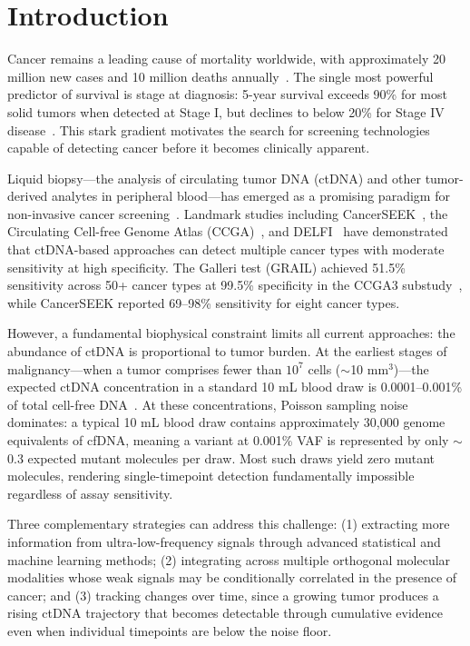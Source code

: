 \documentclass[10pt,a4paper]{article}
\begin{document}
\section{Introduction}

Cancer remains a leading cause of mortality worldwide, with approximately 20 million new cases and 10 million deaths annually~\citet{sung2021global}. The single most powerful predictor of survival is stage at diagnosis: 5-year survival exceeds 90\% for most solid tumors when detected at Stage I, but declines to below 20\% for Stage IV disease~\citet{siegel2024cancer}. This stark gradient motivates the search for screening technologies capable of detecting cancer before it becomes clinically apparent.

Liquid biopsy—the analysis of circulating tumor DNA (ctDNA) and other tumor-derived analytes in peripheral blood—has emerged as a promising paradigm for non-invasive cancer screening~\citet{wan2017liquid,cohen2018detection}. Landmark studies including CancerSEEK~\citet{cohen2018detection}, the Circulating Cell-free Genome Atlas (CCGA)~\citet{liu2020sensitive}, and DELFI~\citet{cristiano2019genome} have demonstrated that ctDNA-based approaches can detect multiple cancer types with moderate sensitivity at high specificity. The Galleri test (GRAIL) achieved 51.5\% sensitivity across 50+ cancer types at 99.5\% specificity in the CCGA3 substudy~\citet{klein2021clinical}, while CancerSEEK reported 69--98\% sensitivity for eight cancer types.

However, a fundamental biophysical constraint limits all current approaches: the abundance of ctDNA is proportional to tumor burden. At the earliest stages of malignancy—when a tumor comprises fewer than $10^7$ cells ($\sim$10 mm$^3$)—the expected ctDNA concentration in a standard 10 mL blood draw is 0.0001--0.001\% of total cell-free DNA~\citet{avanzini2020mathematical}. At these concentrations, Poisson sampling noise dominates: a typical 10 mL blood draw contains approximately 30,000 genome equivalents of cfDNA, meaning a variant at 0.001\% VAF is represented by only $\sim$0.3 expected mutant molecules per draw. Most such draws yield zero mutant molecules, rendering single-timepoint detection fundamentally impossible regardless of assay sensitivity.

Three complementary strategies can address this challenge: (1) extracting more information from ultra-low-frequency signals through advanced statistical and machine learning methods; (2) integrating across multiple orthogonal molecular modalities whose weak signals may be conditionally correlated in the presence of cancer; and (3) tracking changes over time, since a growing tumor produces a rising ctDNA trajectory that becomes detectable through cumulative evidence even when individual timepoints are below the noise floor.
\end{document}
